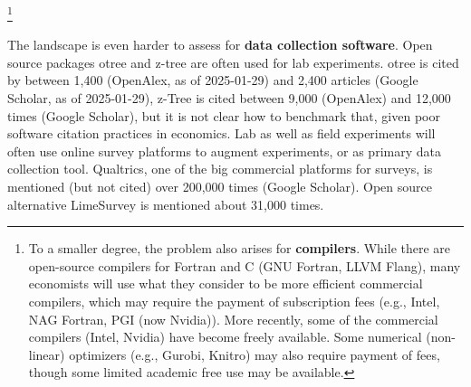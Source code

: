 \documentclass{article}
\begin{document}




\footnote{To a smaller degree, the problem also arises for \textbf{compilers}. While there are open-source compilers for Fortran and C (GNU Fortran, LLVM Flang), many economists will use what they consider to be more efficient commercial compilers, which may require the payment of  subscription fees (e.g., Intel, NAG Fortran, PGI (now Nvidia)). More recently, some of the commercial compilers (Intel, Nvidia) have become freely available. Some numerical (non-linear) optimizers (e.g., Gurobi, Knitro) may also require payment of fees, though some limited academic free use may be available.}
%

The landscape is even harder to assess for \textbf{data collection software}. Open source packages otree and z-tree are often used for lab experiments. otree is cited  by between 1,400 (OpenAlex, as of 2025-01-29) and 2,400 articles (Google Scholar, as of 2025-01-29), z-Tree is cited between 9,000 (OpenAlex) and 12,000 times (Google Scholar), but it is not clear how to benchmark that, given poor software citation practices in economics. Lab as well as field experiments will often use online survey platforms to augment experiments, or as primary data collection tool. Qualtrics, one of the big commercial platforms for surveys, is mentioned (but not cited) over 200,000 times (Google Scholar). Open source alternative LimeSurvey is mentioned about 31,000 times.


\end{document}
